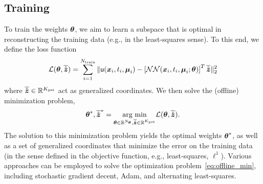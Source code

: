 \documentclass[3p,computermodern,10pt]{elsarticle}
\begin{document}
\subsection{Training}
To train the weights $\boldsymbol \theta$, we aim to learn a subspace that is optimal in reconstructing the training data (e.g., in the least-squares sense). To this end, we define the loss function 
$$\mathcal{L}(\boldsymbol \theta,\overline{\hat{\boldsymbol z}}) = \sum_{i=1}^{N_{\text{train}}} \| \mathsf{u}(\boldsymbol x_i,t_i,\boldsymbol \mu_i) - \left[\mathcal{NN}(\boldsymbol x_i,t_i,\boldsymbol \mu_i;\boldsymbol \theta)\right]^T \overline{\hat{\boldsymbol z}} \|_2^2$$  
where $\overline{\hat{\boldsymbol z}} \in \mathbb{R}^{K_{\text{pst}}}$ act as generalized coordinates. We then solve the (offline) minimization problem,
\begin{equation}\label{eq:offline_min}
\boldsymbol \theta^*,\overline{\hat{\boldsymbol z}}^* = \underset{ \boldsymbol \theta \in \mathbb{R}^{N_{\boldsymbol \theta}},\overline{\hat{\boldsymbol z}} \in \mathbb{R}^{K_{\text{pst}}}}{\text{arg min}} \mathcal{L}(\boldsymbol \theta,\overline{\hat{\boldsymbol z}}).
\end{equation} 
The solution to this minimization problem yields the optimal weights $\boldsymbol \theta^*$, as well as a set of generalized coordinates that minimize the error on the training data (in the sense defined in the objective function, e.g., least-squares, $\ell^1$). Various approaches can be employed to solve the optimization problem~\eqref{eq:offline_min}, including stochastic gradient decent, Adam, and alternating least-squares.
\end{document}
